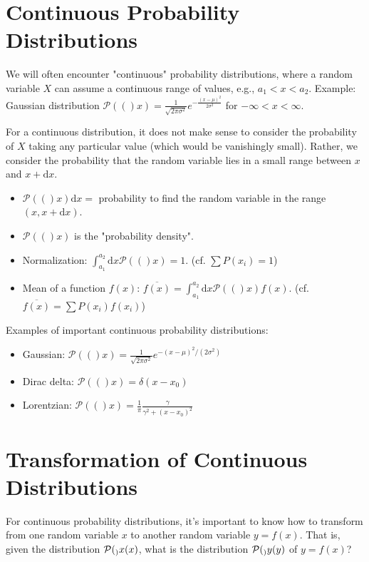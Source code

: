 \documentclass[11pt]{article}
\newcommand{\avg}[1]{\overline{#1}}
\newcommand{\ProbDens}[1]{\mathcal{P}(#1)} %
\newcommand{\dd}[1]{\mathrm{d}#1} %
\begin{document}
\section*{Continuous Probability Distributions}

We will often encounter "continuous" probability distributions, where a random variable $X$ can assume a continuous range of values, e.g., $a_1 < x < a_2$.
Example: Gaussian distribution $\ProbDens(x) = \frac{1}{\sqrt{2\pi\sigma^2}} e^{-\frac{(x-\mu)^2}{2\sigma^2}}$ for $-\infty < x < \infty$.

For a continuous distribution, it does not make sense to consider the probability of $X$ taking any particular value (which would be vanishingly small). Rather, we consider the probability that the random variable lies in a small range between $x$ and $x+\dd{x}$.
\begin{itemize}
    \item $\ProbDens(x) \dd{x} = $ probability to find the random variable in the range $(x, x+\dd{x})$.
    \item $\ProbDens(x)$ is the "probability density".
    \item Normalization: $\int_{a_1}^{a_2} \dd{x} \ProbDens(x) = 1$. (cf. $\sum P(x_i) = 1$)
    \item Mean of a function $f(x)$: $\avg{f(x)} = \int_{a_1}^{a_2} \dd{x} \ProbDens(x) f(x)$. (cf. $\avg{f(x)} = \sum P(x_i) f(x_i)$)
\end{itemize}

Examples of important continuous probability distributions:
\begin{itemize}
    \item Gaussian: $\ProbDens(x) = \frac{1}{\sqrt{2\pi\sigma^2}} e^{-(x-\mu)^2 / (2\sigma^2)}$
    \item Dirac delta: $\ProbDens(x) = \delta(x-x_0)$
    \item Lorentzian: $\ProbDens(x) = \frac{1}{\pi} \frac{\gamma}{\gamma^2 + (x-x_0)^2}$
\end{itemize}

\section*{Transformation of Continuous Distributions}

For continuous probability distributions, it's important to know how to transform from one random variable $x$ to another random variable $y=f(x)$. That is, given the distribution $\ProbDens_x(x)$, what is the distribution $\ProbDens_y(y)$ of $y=f(x)$?
\end{document}
